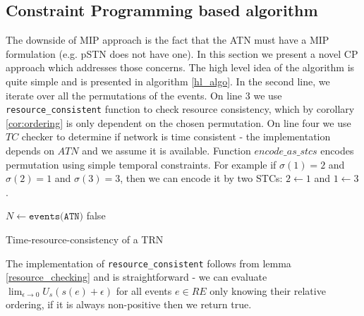 \subsection{Constraint Programming based algorithm}
The downside of MIP approach is the fact that the ATN must have a MIP formulation (e.g. pSTN does not have one). In this section we present a novel CP approach which addresses those concerns. The high level idea of the algorithm is quite simple and is presented in algorithm \ref{hl_algo}. In the second line, we iterate over all the permutations of the events. On line 3 we use \texttt{resource\_consistent} function to check resource consistency, which by corollary \ref{cor:ordering} is only dependent on the chosen permutation. On line four we use $TC$ checker to determine if network is time consistent - the implementation depends on $ATN$ and we assume it is available. Function $encode\_as\_stcs$ encodes permutation using simple temporal constraints. For example if $\sigma(1) = 2$ and $\sigma(2) = 1$ and $\sigma(3) = 3$, then we can encode it by two STCs: $ 2 \leftarrow 1 $ and $1 \leftarrow 3$.

\begin{algorithm}[h]
    \label{hl_algo}
    $N \leftarrow \texttt{events(ATN)}$\;
    \Return false\;
    \caption{Time-resource-consistency of a TRN }
\end{algorithm}
The implementation of \texttt{resource\_consistent} follows from lemma \ref{resource_checking} and is straightforward - we can evaluate $\lim_{\epsilon \to 0} U_s(s(e) + \epsilon)$ for all events $e \in RE$ only knowing their relative ordering, if it is always non-positive then we return true.

